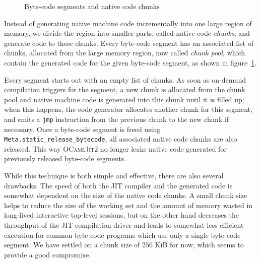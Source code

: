 \documentclass[12pt,a4paper,final]{article}
\begin{document}
\begin{figure}[htb]
  \centering
  \caption{Byte-code segments and native code chunks}
  \label{figure:Byte_code_segments_and_native_code_chunks}
\end{figure}

Instead of generating native machine code incrementally into one large region of
memory, we divide the region into smaller parts, called native code \emph{chunks},
and generate code to these chunks. Every byte-code segment has an associated list of
chunks, allocated from the large memory region, now called \emph{chunk pool},
which contain the generated code for the given byte-code segment, as shown
in figure~\ref{figure:Byte_code_segments_and_native_code_chunks}.

Every segment starts out with an empty list of chunks. As soon as on-demand compilation
triggers for the segment, a new chunk is allocated from the chunk pool and native
machine code is generated into this chunk until it is filled up; when this happens,
the code generator allocates another chunk for this segment, and emits a \texttt{jmp}
instruction from the previous chunk to the new chunk if necessary. Once a byte-code
segment is freed using \texttt{Meta.static\_release\_bytecode}, all associated native code
chunks are also released. This way \textsc{OCamlJit2} no longer leaks
native code generated for previously released byte-code segments.

While this technique is both simple and effective, there are also several drawbacks.
The speed of both the JIT compiler and the generated code is somewhat dependent
on the size of the native code chunks. A small chunk size helps to reduce the size of
the working set and the amount of memory wasted in long-lived interactive top-level
sessions, but on the other hand decreases the throughput of the JIT compilation
driver and leads to somewhat less efficient execution for common byte-code programs
which use only a single byte-code segment. We have settled on a chunk size of $256$ KiB for
now, which seems to provide a good compromise.
\end{document}
